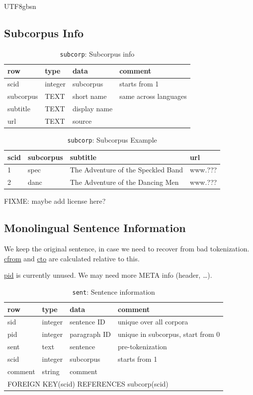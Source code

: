 \documentclass[12pt]{book} %
\newcommand{\fd}[1]{\url{#1}}  %
\begin{document}
\begin{CJK}{UTF8}{gbsn}
\subsection{Subcorpus Info}
\begin{table}[htpb]
  \centering
  \begin{tabular}{llll}
  \textbf{row}   &  \textbf{type} & \textbf{data} & \textbf{comment} \\
  \hline
  scid  & integer & subcorpus & starts from 1\\
  subcorpus & TEXT & short name & same across languages\\
  subtitle &TEXT & display name & \\
  url & TEXT & source & 
\\ \hline
\end{tabular}
\caption{\texttt{subcorp}: Subcorpus info}
\end{table}

\begin{table}[htpb]
  \centering
  \begin{tabular}{llll}
  \textbf{scid}   &  \textbf{subcorpus} & \textbf{subtitle} & \textbf{url} \\
  \hline
  1 & spec & The Adventure of the Speckled Band &  www.??? \\
  2 & danc & The Adventure of the Dancing Men &  www.??? 
\end{tabular}
\caption{\texttt{subcorp}: Subcorpus Example}
\end{table}


FIXME: maybe add license here?


\subsection{Monolingual Sentence Information}

We keep the original sentence, in case we need to recover from bad
tokenization.  \fd{cfrom} and \fd{cto} are calculated relative to this.

\fd{pid} is currently unused.  We may need more META info (header, \ldots).

\begin{table}[htbp]
  \centering
  \begin{tabular}{llll}
  \textbf{row}   &  \textbf{type} & \textbf{data} & \textbf{comment} \\\hline
  sid   & integer & sentence ID & unique over all corpora\\
  pid   & integer & paragraph ID & unique in subcorpus, start from 0\\
  sent  & text    & sentence & pre-tokenization\\
  scid  & integer & subcorpus & starts from 1\\
  comment & string & comment \\
\multicolumn{4}{l}{FOREIGN KEY(scid) REFERENCES subcorp(scid)}
\\ \hline
\end{tabular}
\caption{\texttt{sent}: Sentence information}
\end{table}


\end{CJK}
\end{document}
